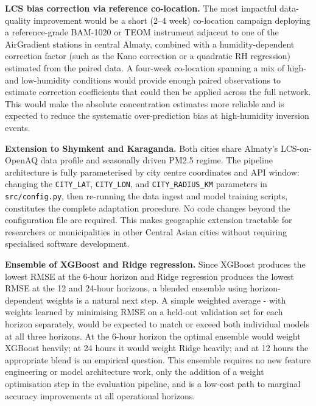 \textbf{LCS bias correction via reference co-location.} The most impactful data-quality improvement would be a short (2--4 week) co-location campaign deploying a reference-grade BAM-1020 or TEOM instrument adjacent to one of the AirGradient stations in central Almaty, combined with a humidity-dependent correction factor (such as the Kano correction or a quadratic RH regression) estimated from the paired data. A four-week co-location spanning a mix of high- and low-humidity conditions would provide enough paired observations to estimate correction coefficients that could then be applied across the full network. This would make the absolute concentration estimates more reliable and is expected to reduce the systematic over-prediction bias at high-humidity inversion events.

\textbf{Extension to Shymkent and Karaganda.} Both cities share Almaty's LCS-on-OpenAQ data profile and seasonally driven PM2.5 regime. The pipeline architecture is fully parameterised by city centre coordinates and API window: changing the \texttt{CITY\_LAT}, \texttt{CITY\_LON}, and \texttt{CITY\_RADIUS\_KM} parameters in \texttt{src/config.py}, then re-running the data ingest and model training scripts, constitutes the complete adaptation procedure. No code changes beyond the configuration file are required. This makes geographic extension tractable for researchers or municipalities in other Central Asian cities without requiring specialised software development.

\textbf{Ensemble of XGBoost and Ridge regression.} Since XGBoost produces the lowest RMSE at the 6-hour horizon and Ridge regression produces the lowest RMSE at the 12 and 24-hour horizons, a blended ensemble using horizon-dependent weights is a natural next step. A simple weighted average - with weights learned by minimising RMSE on a held-out validation set for each horizon separately, would be expected to match or exceed both individual models at all three horizons. At the 6-hour horizon the optimal ensemble would weight XGBoost heavily; at 24 hours it would weight Ridge heavily; and at 12 hours the appropriate blend is an empirical question. This ensemble requires no new feature engineering or model architecture work, only the addition of a weight optimisation step in the evaluation pipeline, and is a low-cost path to marginal accuracy improvements at all operational horizons.

